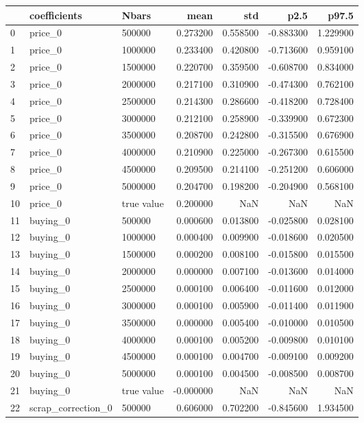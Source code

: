 \begin{tabular}{lllrrrr}
\toprule
 & coefficients & Nbars & mean & std & p2.5 & p97.5 \\
\midrule
0 & price_0 & 500000 & 0.273200 & 0.558500 & -0.883300 & 1.229900 \\
1 & price_0 & 1000000 & 0.233400 & 0.420800 & -0.713600 & 0.959100 \\
2 & price_0 & 1500000 & 0.220700 & 0.359500 & -0.608700 & 0.834000 \\
3 & price_0 & 2000000 & 0.217100 & 0.310900 & -0.474300 & 0.762100 \\
4 & price_0 & 2500000 & 0.214300 & 0.286600 & -0.418200 & 0.728400 \\
5 & price_0 & 3000000 & 0.212100 & 0.258900 & -0.339900 & 0.672300 \\
6 & price_0 & 3500000 & 0.208700 & 0.242800 & -0.315500 & 0.676900 \\
7 & price_0 & 4000000 & 0.210900 & 0.225000 & -0.267300 & 0.615500 \\
8 & price_0 & 4500000 & 0.209500 & 0.214100 & -0.251200 & 0.606000 \\
9 & price_0 & 5000000 & 0.204700 & 0.198200 & -0.204900 & 0.568100 \\
10 & price_0 & true value & 0.200000 & NaN & NaN & NaN \\
11 & buying_0 & 500000 & 0.000600 & 0.013800 & -0.025800 & 0.028100 \\
12 & buying_0 & 1000000 & 0.000400 & 0.009900 & -0.018600 & 0.020500 \\
13 & buying_0 & 1500000 & 0.000200 & 0.008100 & -0.015800 & 0.015500 \\
14 & buying_0 & 2000000 & 0.000000 & 0.007100 & -0.013600 & 0.014000 \\
15 & buying_0 & 2500000 & 0.000100 & 0.006400 & -0.011600 & 0.012000 \\
16 & buying_0 & 3000000 & 0.000100 & 0.005900 & -0.011400 & 0.011900 \\
17 & buying_0 & 3500000 & 0.000000 & 0.005400 & -0.010000 & 0.010500 \\
18 & buying_0 & 4000000 & 0.000100 & 0.005200 & -0.009800 & 0.010100 \\
19 & buying_0 & 4500000 & 0.000100 & 0.004700 & -0.009100 & 0.009200 \\
20 & buying_0 & 5000000 & 0.000100 & 0.004500 & -0.008500 & 0.008700 \\
21 & buying_0 & true value & -0.000000 & NaN & NaN & NaN \\
22 & scrap_correction_0 & 500000 & 0.606000 & 0.702200 & -0.845600 & 1.934500 \\

\end{tabular}
